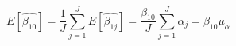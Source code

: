 \begin{equation}
\label{avgest}
E[\hat{\beta_{10}}] = \frac{1}{J}\sum\limits_{j=1}^J{E[\hat{\beta_{1j}}]} = \frac{\beta_{10}}{J}\sum\limits_{j=1}^J{\alpha_j} = \beta_{10}\mu_{\alpha}
\end{equation}